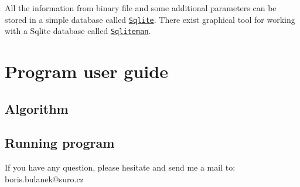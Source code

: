All the information from binary file and some additional parameters can be stored in a simple database called \href{http://www.sqlite.org}{\tt Sqlite}. There exist graphical tool for working with a Sqlite database called \href{http://www.sqliteman.com}{\tt Sqliteman}.\hypertarget{index_running_code}{}\section{Program user guide}\label{index_running_code}
\hypertarget{index_algorithm}{}\subsection{Algorithm}\label{index_algorithm}
\hypertarget{index_running_program}{}\subsection{Running program}\label{index_running_program}
\begin{DoxyVerb}If you have any question, please hesitate and send me a mail to: boris.bulanek@suro.cz\end{DoxyVerb}
 